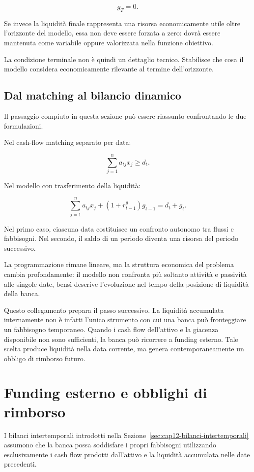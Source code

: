 \[
g_T=0.
\]

Se invece la liquidit\`a finale rappresenta una risorsa economicamente utile
oltre l'orizzonte del modello, essa non deve essere forzata a zero: dovr\`a
essere mantenuta come variabile oppure valorizzata nella funzione obiettivo.

La condizione terminale non \`e quindi un dettaglio tecnico. Stabilisce che
cosa il modello considera economicamente rilevante al termine
dell'orizzonte.

\subsection{Dal matching al bilancio dinamico}

Il passaggio compiuto in questa sezione pu\`o essere riassunto confrontando le
due formulazioni.

Nel cash-flow matching separato per data:

\[
\sum_{j=1}^{n}a_{tj}x_j
\geq
d_t.
\]

Nel modello con trasferimento della liquidit\`a:

\[
\sum_{j=1}^{n}a_{tj}x_j
+
(1+r^g_{t-1})g_{t-1}
=
d_t+g_t.
\]

Nel primo caso, ciascuna data costituisce un confronto autonomo tra flussi e
fabbisogni. Nel secondo, il saldo di un periodo diventa una risorsa del
periodo successivo.

La programmazione rimane lineare, ma la struttura economica del problema
cambia profondamente: il modello non confronta pi\`u soltanto attivit\`a e
passivit\`a alle singole date, bens\`i descrive l'evoluzione nel tempo della
posizione di liquidit\`a della banca.

Questo collegamento prepara il passo successivo. La liquidit\`a accumulata
internamente non \`e infatti l'unico strumento con cui una banca pu\`o
fronteggiare un fabbisogno temporaneo. Quando i cash flow dell'attivo e la
giacenza disponibile non sono sufficienti, la banca pu\`o ricorrere a
funding esterno. Tale scelta produce liquidit\`a nella data corrente, ma
genera contemporaneamente un obbligo di rimborso futuro.

\section{Funding esterno e obblighi di rimborso}

\label{sec:cap12-funding}

I bilanci intertemporali introdotti nella
Sezione~\ref{sec:cap12-bilanci-intertemporali} assumono che la banca possa
soddisfare i propri fabbisogni utilizzando esclusivamente i cash flow prodotti
dall'attivo e la liquidit\`a accumulata nelle date precedenti.


